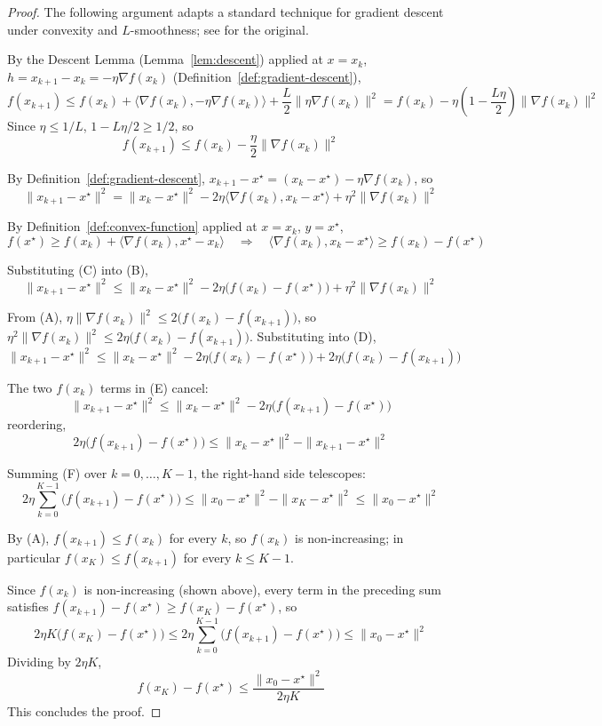 		\begin{proof}
			The following argument adapts a standard technique for gradient descent under convexity and $L$-smoothness; see \cite[\S3.2]{Bubeck2015} for the original.
			
			By the Descent Lemma (Lemma~\ref{lem:descent}) applied at $x=x_k$, $h=x_{k+1}-x_k=-\eta\nabla f(x_k)$ (Definition~\ref{def:gradient-descent}),
			\[
				f(x_{k+1}) \le f(x_k) + \langle \nabla f(x_k), -\eta\nabla f(x_k)\rangle + \frac{L}{2}\|\eta\nabla f(x_k)\|^2 = f(x_k) - \eta\left(1-\frac{L\eta}{2}\right)\|\nabla f(x_k)\|^2
			\]
			Since $\eta\le1/L$, $1-L\eta/2\ge1/2$, so
			\[
				f(x_{k+1}) \le f(x_k) - \frac{\eta}{2}\|\nabla f(x_k)\|^2 \tag{A}
			\]
			
			By Definition~\ref{def:gradient-descent}, $x_{k+1}-x^\star = (x_k-x^\star) - \eta\nabla f(x_k)$, so
			\[
				\|x_{k+1}-x^\star\|^2 = \|x_k-x^\star\|^2 - 2\eta\langle\nabla f(x_k), x_k-x^\star\rangle + \eta^2\|\nabla f(x_k)\|^2 \tag{B}
			\]
			
			By Definition~\ref{def:convex-function} applied at $x=x_k$, $y=x^\star$,
			\[
				f(x^\star) \ge f(x_k) + \langle\nabla f(x_k), x^\star-x_k\rangle \quad\Longrightarrow\quad \langle\nabla f(x_k), x_k-x^\star\rangle \ge f(x_k)-f(x^\star) \tag{C}
			\]
			
			Substituting (C) into (B),
			\[
				\|x_{k+1}-x^\star\|^2 \le \|x_k-x^\star\|^2 - 2\eta\big(f(x_k)-f(x^\star)\big) + \eta^2\|\nabla f(x_k)\|^2 \tag{D}
			\]
			
			From (A), $\eta\|\nabla f(x_k)\|^2 \le 2\big(f(x_k)-f(x_{k+1})\big)$, so $\eta^2\|\nabla f(x_k)\|^2 \le 2\eta\big(f(x_k)-f(x_{k+1})\big)$. Substituting into (D),
			\[
				\|x_{k+1}-x^\star\|^2 \le \|x_k-x^\star\|^2 - 2\eta\big(f(x_k)-f(x^\star)\big) + 2\eta\big(f(x_k)-f(x_{k+1})\big) \tag{E}
			\]
			
			The two $f(x_k)$ terms in (E) cancel:
			\[
				\|x_{k+1}-x^\star\|^2 \le \|x_k-x^\star\|^2 - 2\eta\big(f(x_{k+1})-f(x^\star)\big)
			\]
			reordering,
			\[
				2\eta\big(f(x_{k+1})-f(x^\star)\big) \le \|x_k-x^\star\|^2 - \|x_{k+1}-x^\star\|^2 \tag{F}
			\]
			
			Summing (F) over $k=0,\dots,K-1$, the right-hand side telescopes:
			\[
				2\eta\sum_{k=0}^{K-1}\big(f(x_{k+1})-f(x^\star)\big) \le \|x_0-x^\star\|^2 - \|x_K-x^\star\|^2 \le \|x_0-x^\star\|^2
			\]
			
			By (A), $f(x_{k+1})\le f(x_k)$ for every $k$, so $f(x_k)$ is non-increasing; in particular $f(x_K)\le f(x_{k+1})$ for every $k\le K-1$.
			
			Since $f(x_k)$ is non-increasing (shown above), every term in the preceding sum satisfies $f(x_{k+1})-f(x^\star) \ge f(x_K)-f(x^\star)$, so
			\[
				2\eta K\big(f(x_K)-f(x^\star)\big) \le 2\eta\sum_{k=0}^{K-1}\big(f(x_{k+1})-f(x^\star)\big) \le \|x_0-x^\star\|^2
			\]
			Dividing by $2\eta K$,
			\[
				f(x_K)-f(x^\star) \le \frac{\|x_0-x^\star\|^2}{2\eta K}
			\]
			This concludes the proof.
		\end{proof}
		
